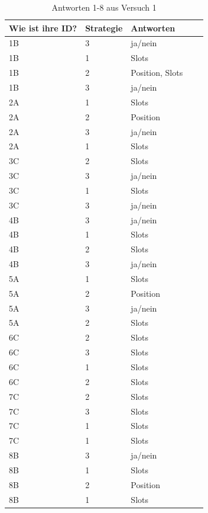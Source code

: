 \documentclass[12pt,a4paper]{scrartcl}
\begin{document}
\begin{appendix}
\begin{table}
\centering
\caption{Antworten 1-8 aus Versuch 1}
\begin{tabular}{ | l | l | l | l | l | }
\hline
Wie ist ihre ID? & Strategie & Antworten \\ \hline \hline
	1B & 3 & ja/nein \\ \hline
	1B & 1 & Slots \\ \hline
	1B & 2 & Position, Slots \\ \hline 
	1B & 3 & ja/nein \\ \hline \hline
	2A & 1 & Slots \\ \hline
	2A & 2 & Position  \\ \hline
	2A & 3 & ja/nein \\ \hline
	2A & 1 & Slots \\ \hline \hline
	3C & 2 & Slots \\ \hline
	3C & 3 & ja/nein \\ \hline
	3C & 1 & Slots \\ \hline
	3C & 3 & ja/nein \\ \hline \hline
	4B & 3 & ja/nein \\ \hline
	4B & 1 & Slots \\ \hline
	4B & 2 & Slots \\ \hline
	4B & 3 & ja/nein \\ \hline \hline
	5A & 1 & Slots \\ \hline
	5A & 2 & Position \\ \hline
	5A & 3 & ja/nein \\ \hline
	5A & 2 & Slots \\ \hline \hline
	6C & 2 & Slots \\ \hline
	6C & 3 & Slots \\ \hline
	6C & 1 & Slots \\ \hline
	6C & 2 & Slots \\ \hline \hline
	7C & 2 & Slots \\ \hline
	7C & 3 & Slots \\ \hline
	7C & 1 & Slots \\ \hline
	7C & 1 & Slots \\ \hline \hline
	8B & 3 & ja/nein \\ \hline
	8B & 1 & Slots \\ \hline
	8B & 2 & Position \\ \hline
	8B & 1 & Slots \\ \hline 
\end{tabular}

\end{table}


\end{appendix}
\end{document}
